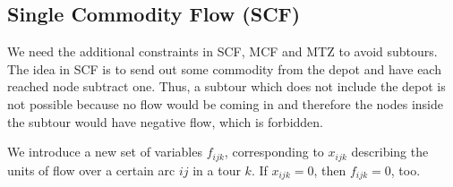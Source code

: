 \subsection{Single Commodity Flow (SCF)}

We need the additional constraints in SCF, MCF and MTZ to avoid subtours. The
idea in SCF is to send out some commodity from the depot and have each reached node subtract one. Thus, a 
subtour which does not include the depot is not possible because no flow would be coming in
and therefore the nodes inside the subtour would have negative flow, which is forbidden.

We introduce a new set of variables $f_{ijk}$, corresponding to $x_{ijk}$ describing the units
of flow over a certain arc $ij$ in a tour $k$. If $x_{ijk} = 0$, then $f_{ijk} = 0$, too.

